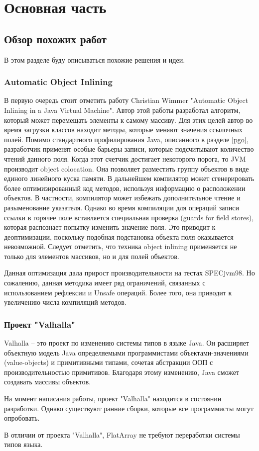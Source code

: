 \section{Основная часть}
\subsection{Обзор похожих работ}
В этом разделе буду описываться похожие решения и идеи.
\subsubsection{Automatic Object Inlining} 
В первую очередь стоит отметить работу Christian Wimmer "Automatic Object Inlining in a Java Virtual Machine"\cite{wimmer-field-inlining}.
Автор этой работы разработал алгоритм, который может перемещать элементы к самому массиву.
Для этих целей автор во время загрузки классов находит методы, которые меняют значения ссылочных полей. 
Помимо стандартного профилирования Java, описанного в разделе \ref{pgo}, разработчик применят особые барьеры записи, которые подсчитывают количество чтений данного поля. Когда этот счетчик достигает некоторого порога, то JVM производит object colocation. 
Она позволяет разместить группу объектов в виде единого линейного куска памяти. 
В дальнейшем компилятор может сгенерировать более оптимизированный код методов, используя информацию о расположении объектов. В частности, компилятор может избежать дополнительное чтение и разыменование указателя. 
Однако во время компиляции для операций записи ссылки в горячее поле вставляется специальная проверка (guards for field stores), которая распознает попытку изменить значение поля. 
Это приводит к деоптимизации, поскольку подобная подстановка объекта поля оказывается невозможной. Следует отметить, что техника object inlining применяется не только для элементов массивов, но и для полей объектов.
\par
Данная оптимизация дала прирост производительности на тестах SPECjvm98\cite{spec98}. 
Но сожалению, данная методика имеет ряд ограничений, связанных с использованием рефлексии и Unsafe операций. Более того, она приводит к увеличению числа компиляций методов.
\subsubsection{Проект "Valhalla"}
Valhalla -- это проект по изменению системы типов в языке Java\cite{valhalla}. Он расширяет объектную модель Java определяемыми программистами объектами-значениями (value-objects) и примитивными типами, сочетая абстракции ООП с производительностью примитивов. Благодаря этому изменению, Java сможет создавать массивы объектов\cite{valhalla-value-object}.
\par
На момент написания работы, проект "Valhalla" находится в состоянии разработки. Однако существуют ранние сборки, которые все программисты могут опробовать.
\par
В отличии от проекта "Valhalla", FlatArray не требуют переработки системы типов языка.

